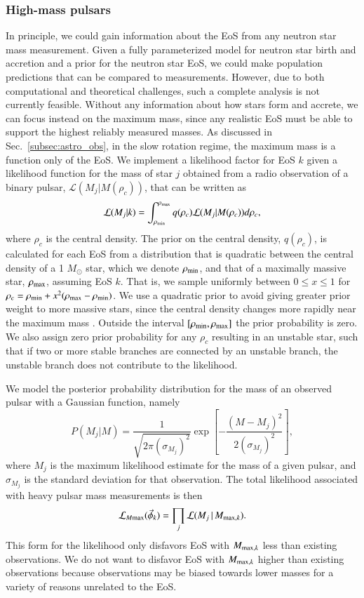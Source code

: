 \documentclass[aps,prd,nofootinbib,tightenlines,notitlepage,floatfix,superscriptaddress,showkeys,twocolumn]{revtex4-1}
\begin{document}
\subsubsection{High-mass pulsars}
In principle, we could gain information about the EoS from any neutron star mass measurement. Given a fully parameterized model for neutron star birth and accretion and a prior for the neutron star EoS, we could make population predictions that can be compared to measurements. However, due to both computational and theoretical challenges, such a complete analysis is not currently feasible. Without any information about how stars form and accrete, we can focus instead on the maximum mass, since any realistic EoS must be able to support the highest reliably measured masses. As discussed in Sec.~\ref{subsec:astro_obs}, in the slow rotation regime, the maximum mass is a function only of the EoS. We implement a likelihood factor for EoS $k$ given a likelihood function for the mass of star $j$ obtained from a radio observation of a binary pulsar, $\mathcal{L}(M_j|M(\rho_c))$, that can be written as
\begin{equation}
    \mathcal{L}(M_j | k) = \int_{\rho_{\rm min}}^{\rho_{\rm max}} q(\rho_c)\mathcal{L}(M_j|M(\rho_c))d\rho_c,
\end{equation}
where $\rho_c$ is the central density. The prior on the central density, $q(\rho_c)$, is calculated for each EoS from a distribution that is quadratic between the central density of a 1 $M_\odot$ star, which we denote $\rho_{\rm min}$, and that of a maximally massive star, $\rho_{\rm max}$, assuming EoS $k$. That is, we sample uniformly between $0 \leq x \leq 1$ for $\rho_c = \rho_{\rm min} + x^2 (\rho_{\rm max} - \rho_{\rm min})$. We use a quadratic prior to avoid giving greater prior weight to more massive stars, since the central density changes more rapidly near the maximum mass \cite{Miller:2021qha}. Outside the interval $[\rho_{\rm min},\rho_{\rm max}]$ the prior probability is zero. We also assign zero prior probability for any $\rho_c$ resulting in an unstable star, such that if two or more stable branches are connected by an unstable branch, the unstable branch does not contribute to the likelihood.

We model the posterior probability distribution for the mass of an observed pulsar with a Gaussian function, namely
\begin{equation}
    P(M_j|M) = \frac{1}{\sqrt{2 \pi (\sigma_{M_j})^2}} \exp\left[-\frac{(M - M_j)^2}{2(\sigma_{M_j})^2} \right],
\end{equation}
where $M_j$ is the maximum likelihood estimate for the mass of a given pulsar, and $\sigma_{M_j}$ is the standard deviation for that observation. 
The total likelihood associated with heavy pulsar mass measurements is then
\begin{equation}
    \mathcal{L}_{M{\rm max}}(\vec{\phi}_k) = \prod_j \mathcal{L}({M_j\, | \,M_{{\rm max}, k}}).
\end{equation}
This form for the likelihood only disfavors EoS with $M_{{\rm max}, k}$ less than existing observations. We do not want to disfavor EoS with $M_{{\rm max}, k}$ higher than existing observations because observations may be biased towards lower masses for a variety of reasons unrelated to the EoS.
\end{document}
